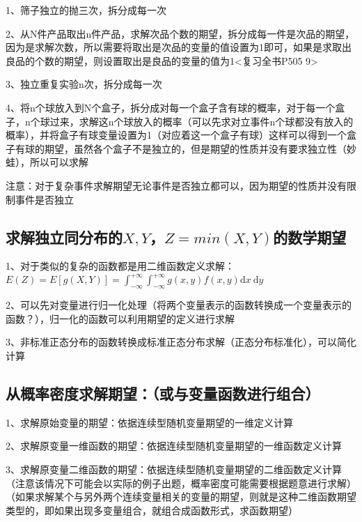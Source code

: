 1、筛子独立的抛三次，拆分成每一次

2、从N件产品取出n件产品，求解次品个数的期望，拆分成每一件是次品的期望，因为是求解次数，所以需要将取出是次品的变量的值设置为1即可，如果是求取出良品的个数的期望，则设置取出是良品的变量的值为1<复习全书P505 9>

3、独立重复实验n次，拆分成每一次

4、将n个球放入到N个盒子，拆分成对每一个盒子含有球的概率，对于每一个盒子，n个球过来，求解这n个球放入的概率（可以先求对立事件n个球都没有放入的概率），并将盒子有球变量设置为1（对应着这一个盒子有球）这样可以得到一个盒子有球的期望，虽然各个盒子不是独立的，但是期望的性质并没有要求独立性（妙蛙），所以可以求解

注意：对于复杂事件求解期望无论事件是否独立都可以，因为期望的性质并没有限制事件是否独立



\subsection{求解独立同分布的$X,Y$，$Z=min(X,Y)$的数学期望}

1、对于类似的复杂的函数都是用二维函数定义求解：$E(Z)=E[g(X, Y)]=\int_{-\infty}^{+\infty} \int_{-\infty}^{+\infty} g(x, y) f(x, y) \mathrm{d} x \mathrm{~d} y$

2、可以先对变量进行归一化处理（将两个变量表示的函数转换成一个变量表示的函数？），归一化的函数可以利用期望的定义进行求解

3、非标准正态分布的函数转换成标准正态分布求解（正态分布标准化），可以简化计算



\subsection{从概率密度求解期望：（或与变量函数进行组合）}

1、求解原始变量的期望：依据连续型随机变量期望的一维定义计算

2、求解原变量一维函数的期望：依据连续型随机变量期望的一维函数定义计算

3、求解原变量二维函数的期望：依据连续型随机变量期望的二维函数定义计算（注意该情况下可能会以实际的例子出题，概率密度可能需要根据题意进行求解）（如果求解某个与另外两个连续变量相关的变量的期望，则就是这种二维函数期望类型的，即如果出现多变量组合，就组合成函数形式，求函数期望）


